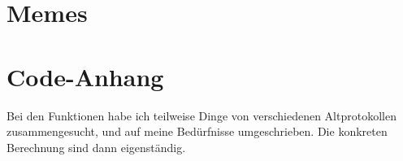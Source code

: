 \section{Memes}


\section{Code-Anhang}
Bei den Funktionen habe ich teilweise Dinge von verschiedenen Altprotokollen zusammengesucht, und auf meine Bedürfnisse umgeschrieben. Die konkreten Berechnung sind dann eigenständig.

